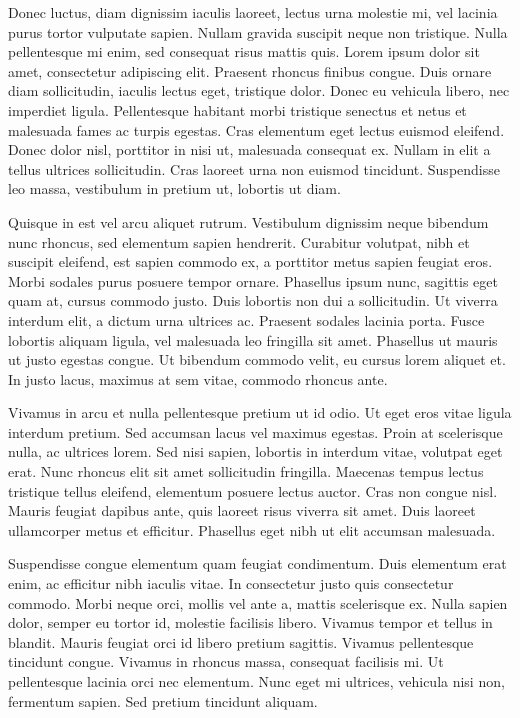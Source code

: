 \documentclass{article}
\begin{document}
Donec luctus, diam dignissim iaculis laoreet, lectus urna molestie mi, vel lacinia purus tortor vulputate sapien. Nullam gravida suscipit neque non tristique. Nulla pellentesque mi enim, sed consequat risus mattis quis. Lorem ipsum dolor sit amet, consectetur adipiscing elit. Praesent rhoncus finibus congue. Duis ornare diam sollicitudin, iaculis lectus eget, tristique dolor. Donec eu vehicula libero, nec imperdiet ligula. Pellentesque habitant morbi tristique senectus et netus et malesuada fames ac turpis egestas. Cras elementum eget lectus euismod eleifend. Donec dolor nisl, porttitor in nisi ut, malesuada consequat ex. Nullam in elit a tellus ultrices sollicitudin. Cras laoreet urna non euismod tincidunt. Suspendisse leo massa, vestibulum in pretium ut, lobortis ut diam.

Quisque in est vel arcu aliquet rutrum. Vestibulum dignissim neque bibendum nunc rhoncus, sed elementum sapien hendrerit. Curabitur volutpat, nibh et suscipit eleifend, est sapien commodo ex, a porttitor metus sapien feugiat eros. Morbi sodales purus posuere tempor ornare. Phasellus ipsum nunc, sagittis eget quam at, cursus commodo justo. Duis lobortis non dui a sollicitudin. Ut viverra interdum elit, a dictum urna ultrices ac. Praesent sodales lacinia porta. Fusce lobortis aliquam ligula, vel malesuada leo fringilla sit amet. Phasellus ut mauris ut justo egestas congue. Ut bibendum commodo velit, eu cursus lorem aliquet et. In justo lacus, maximus at sem vitae, commodo rhoncus ante.

Vivamus in arcu et nulla pellentesque pretium ut id odio. Ut eget eros vitae ligula interdum pretium. Sed accumsan lacus vel maximus egestas. Proin at scelerisque nulla, ac ultrices lorem. Sed nisi sapien, lobortis in interdum vitae, volutpat eget erat. Nunc rhoncus elit sit amet sollicitudin fringilla. Maecenas tempus lectus tristique tellus eleifend, elementum posuere lectus auctor. Cras non congue nisl. Mauris feugiat dapibus ante, quis laoreet risus viverra sit amet. Duis laoreet ullamcorper metus et efficitur. Phasellus eget nibh ut elit accumsan malesuada.

Suspendisse congue elementum quam feugiat condimentum. Duis elementum erat enim, ac efficitur nibh iaculis vitae. In consectetur justo quis consectetur commodo. Morbi neque orci, mollis vel ante a, mattis scelerisque ex. Nulla sapien dolor, semper eu tortor id, molestie facilisis libero. Vivamus tempor et tellus in blandit. Mauris feugiat orci id libero pretium sagittis. Vivamus pellentesque tincidunt congue. Vivamus in rhoncus massa, consequat facilisis mi. Ut pellentesque lacinia orci nec elementum. Nunc eget mi ultrices, vehicula nisi non, fermentum sapien. Sed pretium tincidunt aliquam.
\end{document}
